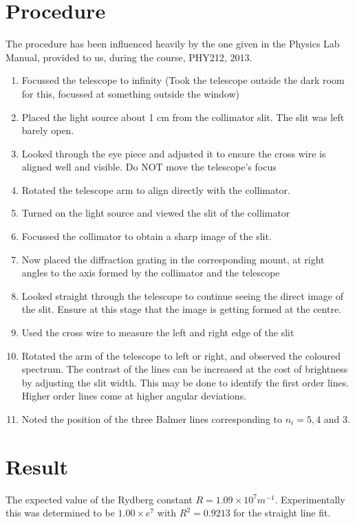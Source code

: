 \section{Procedure}
	The procedure has been influenced heavily by the one given in the Physics Lab Manual, provided to us, during the course, PHY212, 2013.
	\begin{enumerate}
		\item Focussed the telescope to infinity (Took the telescope outside the dark room for this, focussed at something outside the window)
		\item Placed the light source about 1 cm from the collimator slit. The slit was left barely open.
		\item Looked through the eye piece and adjusted it to ensure the cross wire is aligned well and visible. Do NOT move the telescope's focus
		\item Rotated the telescope arm to align directly with the collimator.
		\item Turned on the light source and viewed the slit of the collimator
		\item Focussed the collimator to obtain a sharp image of the slit.
		\item Now placed the diffraction grating in the corresponding mount, at right angles to the axis formed by the collimator and the telescope
		\item Looked straight through the telescope to continue seeing the direct image of the slit. Ensure at this stage that the image is getting formed at the centre.
		\item Used the cross wire to measure the left and right edge of the slit
		\item Rotated the arm of the telescope to left or right, and observed the coloured spectrum. The contrast of the lines can be increased at the cost of brightness by adjusting the slit width. This may be done to identify the first order lines. Higher order lines come at higher angular deviations.
		\item Noted the position of the three Balmer lines corresponding to $n_i=5,4$ and 3.
	\end{enumerate}

\section{Result}
	The expected value of the Rydberg constant $R=1.09 \times 10^7 m^{-1}$. Experimentally this was determined to be $1.00 \times e^{7}$ with $R^2=0.9213$ for the straight line fit.

